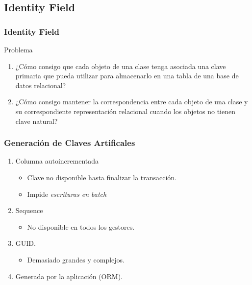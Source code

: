 \documentclass[a4paper,slidestop,xcolor=pst,blue]{beamer}
\begin{document}
\subsection{Identity Field}

\begin{frame}[c]
    \frametitle{Identity Field}
    \begin{block}{Problema}
        \begin{enumerate}
            \item<1-> ¿Cómo consigo que cada objeto de una clase tenga asociada una clave primaria que pueda utilizar para almacenarlo en una tabla de una base de datos relacional?
            \item<2-> ¿Cómo consigo mantener la correspondencia entre cada objeto de una clase y su correspondiente representación relacional cuando los objetos no tienen clave natural?
        \end{enumerate}
    \end{block}
\end{frame}

\begin{frame}[c]
    \frametitle{Generación de Claves Artificales}
    \begin{enumerate}
        \item<1-> Columna autoincrementada
            \begin{itemize}
                \item<2-> Clave no disponible hasta finalizar la transacción.
                \item<3-> Impide \emph{escrituras en batch}
            \end{itemize}
        \item<4-> Sequence
            \begin{itemize}
                \item<5-> No disponible en todos los gestores.
            \end{itemize}
        \item<6-> GUID.
            \begin{itemize}
                \item<7-> Demasiado grandes y complejos.
            \end{itemize}
        \item<8-> Generada por la aplicación (ORM).
    \end{enumerate}
\end{frame}
\end{document}
